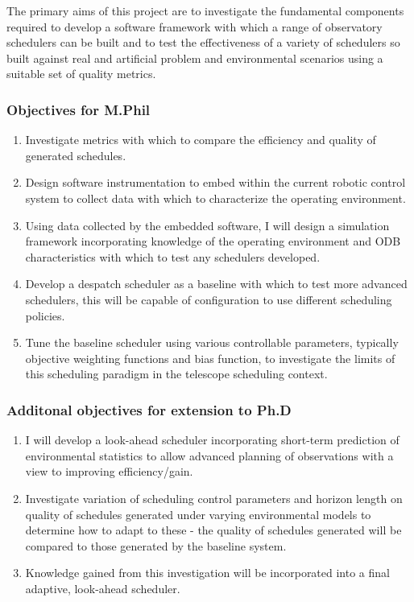 \documentclass[12pt,a4paper]{article}
\begin{document}
The primary aims of this project are to investigate the fundamental components required to develop a software framework with which a range of observatory schedulers can be built and to test the effectiveness of a variety of schedulers so built against real and artificial problem and environmental scenarios using a suitable set of quality metrics. 


\subsubsection{Objectives for M.Phil}

\begin{enumerate}
\item Investigate metrics with which to compare the efficiency and quality of generated schedules.

\item Design software instrumentation to embed within the current robotic control system to collect data with which to characterize the operating environment.

\item Using data collected by the embedded software, I will design a simulation framework incorporating knowledge of the operating environment and ODB characteristics with which to test any schedulers developed.

\item Develop a despatch scheduler as a baseline with which to test more advanced schedulers, this will be capable of configuration to use different scheduling policies.

\item Tune the baseline scheduler using various controllable parameters, typically objective weighting functions and bias function, to investigate the limits of this scheduling paradigm in the telescope scheduling context.
\end{enumerate}

\subsubsection{Additonal objectives for extension to Ph.D}

\begin{enumerate}
\item I will develop a look-ahead scheduler incorporating short-term prediction of environmental statistics to allow advanced planning of observations with a view to improving efficiency/gain.

\item Investigate variation of scheduling control parameters and horizon length on quality of schedules generated under varying environmental models to determine how to adapt to these - the quality of schedules generated will be compared to those generated by the baseline system.

\item Knowledge gained from this investigation will be incorporated into a final adaptive, look-ahead scheduler.

\end{enumerate}
\end{document}
